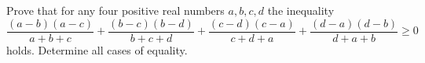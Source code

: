 Prove that for any four positive real numbers $a, b, c, d$ the inequality
\[
\frac{(a-b)(a-c)}{a+b+c} + \frac{(b-c)(b-d)}{b+c+d} + \frac{(c-d)(c-a)}{c+d+a} + \frac{(d-a)(d-b)}{d+a+b} \geq 0
\]
holds. Determine all cases of equality.
